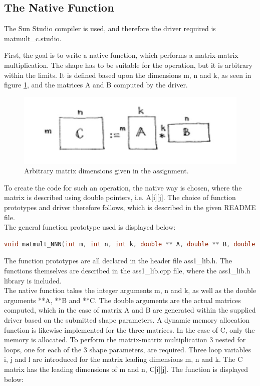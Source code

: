 \subsection{The Native Function}

The Sun Studio compiler is used, and therefore the driver required is matmult\_c.studio.


First, the goal is to write a native function, which performs a matrix-matrix multiplication. The shape has to be suitable for the operation, but it is arbitrary within the limits. It is defined based upon the dimensions m, n and k, as seen in figure \ref{fig:matrix1}, and the matrices A and B computed by the driver.

\begin{figure}[h!] 
	\begin{center}
		\includegraphics[width=0.7 \textwidth]{fig/matrix1.PNG} 
		\caption{Arbitrary matrix dimensions given in the assignment.}
		\label{fig:matrix1}
	\end{center}
\end{figure}


To create the code for such an operation, the native way is chosen, where the matrix is described using double pointers, i.e. A[i][j]. The choice of function prototypes and driver therefore follows, which is described in the given README file.  \\
The general function prototype used is displayed below:
\begin{lstlisting}[language=C++, caption=Function Prototype]
void matmult_NNN(int m, int n, int k, double ** A, double ** B, double ** C)
\end{lstlisting}

The function prototypes are all declared in the header file ass1\_lib.h. The functions themselves are described in the ass1\_lib.cpp file, where the ass1\_lib.h library is included. \\

The native function takes the integer arguments m, n and k, as well as the double arguments **A, **B and **C. The double arguments are the actual matrices computed, which in the case of matrix A and B are generated within the supplied driver based on the submitted shape parameters. A dynamic memory allocation function is likewise implemented for the three matrices. In the case of C, only the memory is allocated. To perform the matrix-matrix multiplication 3 nested for loops, one for each of the 3 shape parameters, are required. Three loop variables i, j and l are introduced for the matrix leading dimensions m, n and k. The C matrix has the leading dimensions of m and n, C[i][j]. The function is displayed below:

